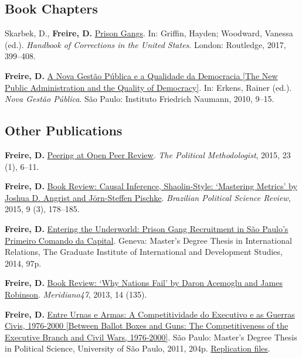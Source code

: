 \documentclass[a4paper]{article}
\renewenvironment{itemize}{
  \begin{list}{}{
    \setlength{\leftmargin}{1.5em}
  }
}{
  \end{list}
}
\begin{document}
\subsection*{Book Chapters}

\begin{itemize}
	\item Skarbek, D., \textbf{Freire, D.} \href{https://osf.io/kuqqx/}{Prison Gangs}. In: Griffin, Hayden; Woodward, Vanessa (ed.). \textit{Handbook of Corrections in the United States}. London: Routledge, 2017, 399--408.
	\item \textbf{Freire, D.} \href{https://fnst.org/sites/default/files/uploads/2017/12/08/ngp.pdf}{A Nova Gest\~{a}o P\'{u}blica e a Qualidade da Democracia {[}The New Public Administration and the Quality of Democracy{]}}. In: Erkens, Rainer (ed.). \textit{Nova Gest\~{a}o P\'{u}blica}. S\~{a}o Paulo: Instituto Friedrich Naumann, 2010, 9--15.
\end{itemize}

\subsection*{Other Publications}

\begin{itemize}
	\item \textbf{Freire, D.} \href{https://thepoliticalmethodologist.files.wordpress.com/2016/02/tpm_v23_n1.pdf}{Peering at Open Peer Review}. \textit{The Political Methodologist}, 2015, 23 (1), 6--11.
	\item \textbf{Freire, D.} \href{http://www.scielo.br/readcube/epdf.php?doi=10.1590/1981-38212015000300026&pid=S1981-38212015000300178&pdf_path=bpsr/v9n3/1981-3821-bpsr-9-3-0178.pdf&lang=en}{Book Review: Causal Inference, Shaolin-Style: `Mastering Metrics' by Joshua D. Angrist and J\"{o}rn-Steffen Pischke}. \textit{Brazilian Political Science Review}, 2015, 9 (3), 178--185.
	\item \textbf{Freire, D.} \href{http://dx.doi.org/10.6084/m9.figshare.1209203}{Entering the Underworld: Prison Gang Recruitment in S\~{a}o Paulo's Primeiro Comando da Capital}. Geneva: Master's Degree Thesis in International Relations, The Graduate Institute of International and Development Studies, 2014, 97p.
	\item \textbf{Freire, D.} \href{http://seer.bce.unb.br/index.php/MED/article/view/7505/6497}{Book Review: `Why Nations Fail' by Daron Acemoglu and James Robinson}. \textit{Meridiano47}, 2013, 14 (135).
	\item \textbf{Freire, D.} \href{http://dx.doi.org/10.6084/m9.figshare.963082}{Entre Urnas e Armas: A Competitividade do Executivo e as Guerras Civis, 1976-2000 {[}Between Ballot Boxes and Guns: The Competitiveness of the Executive Branch and Civil Wars, 1976-2000{]}}. S\~{a}o Paulo: Master's Degree Thesis in Political Science, University of S\~{a}o Paulo, 2011, 204p. \href{http://dx.doi.org/10.6084/m9.figshare.963183}{Replication files}.
\end{itemize}
\end{document}
